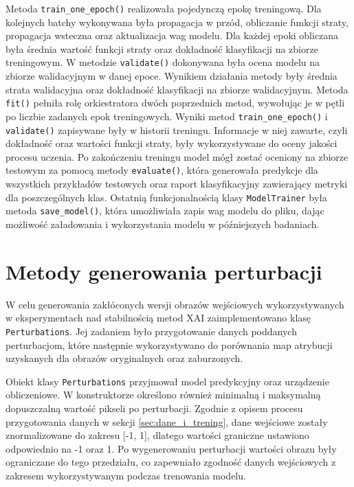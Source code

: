 Metoda \texttt{train\_one\_epoch()} realizowała pojedynczą epokę treningową. Dla kolejnych batchy wykonywana była propagacja w przód, obliczanie funkcji straty, propagacja wsteczna oraz aktualizacja wag modelu. Dla każdej epoki obliczana była średnia wartość funkcji straty oraz dokładność klasyfikacji na zbiorze treningowym. W metodzie \texttt{validate()} dokonywana była ocena modelu na zbiorze walidacyjnym w danej epoce. Wynikiem działania metody były średnia strata walidacyjna oraz dokładność klasyfikacji na zbiorze walidacyjnym. Metoda \texttt{fit()} pełniła rolę orkiestratora dwóch poprzednich metod, wywołując je w pętli po liczbie zadanych epok treningowych. Wyniki metod \texttt{train\_one\_epoch()} i \texttt{validate()} zapisywane były w historii treningu. Informacje w niej zawarte, czyli dokładność oraz wartości funkcji straty, były wykorzystywane do oceny jakości procesu uczenia. Po zakończeniu treningu model mógł zostać oceniony na zbiorze testowym za pomocą metody \texttt{evaluate()}, która generowała predykcje dla wszystkich przykładów testowych oraz raport klasyfikacyjny zawierający metryki dla poszczególnych klas. Ostatnią funkcjonalnością klasy \texttt{ModelTrainer} była metoda \texttt{save\_model()}, która umożliwiała zapis wag modelu do pliku, dając możliwość załadowania i wykorzystania modelu w późniejszych badaniach.

\section{Metody generowania perturbacji}
\label{sec:metody_generowania_perturbacji}

W celu generowania zakłóconych wersji obrazów wejściowych wykorzystywanych w eksperymentach nad stabilnością metod XAI zaimplementowano klasę \texttt{Perturbations}. Jej zadaniem było przygotowanie danych poddanych perturbacjom, które następnie wykorzystywano do porównania map atrybucji uzyskanych dla obrazów oryginalnych oraz zaburzonych.

Obiekt klasy \texttt{Perturbations} przyjmował model predykcyjny oraz urządzenie obliczeniowe. W konstruktorze określono również minimalną i maksymalną dopuszczalną wartość pikseli po perturbacji. Zgodnie z opisem procesu przygotowania danych w sekcji \ref{sec:dane_i_trening}, dane wejściowe zostały znormalizowane do zakresu [-1, 1], dlatego wartości graniczne ustawiono odpowiednio na -1 oraz 1. Po wygenerowaniu perturbacji wartości obrazu były ograniczane do tego przedziału, co zapewniało zgodność danych wejściowych z zakresem wykorzystywanym podczas trenowania modelu.

